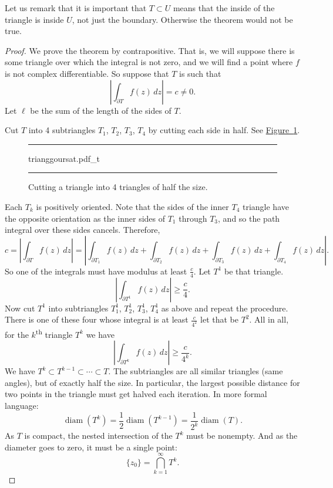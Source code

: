 \documentclass[12pt,openany]{book}
\newcommand{\abs}[1]{\left\lvert {#1} \right\rvert}
\theoremstyle{plain}
\theoremstyle{remark}
\theoremstyle{definition}
\newenvironment{myfig}{%
\begin{figure}[h!t]
\noindent\rule{\textwidth}{0.4pt}\vspace{12pt}\par\centering}%
{\par\noindent\rule{\textwidth}{0.4pt}
\end{figure}}
\theoremstyle{exercise}
\theoremstyle{example}
\newcommand{\figureref}[1]{\hyperref[#1]{Figure~\ref*{#1}}}
\begin{document}
Let us remark that it is important that $T \subset U$ means that the inside
of the triangle is inside $U$, not just the boundary.  Otherwise the theorem
would not be true.

\begin{proof}
We prove the theorem by contrapositive.  That is, we will suppose there is
some triangle over which the integral is not zero, and we will find a point
where $f$ is not complex differentiable.  So suppose that $T$ is such
that
\begin{equation*}
\abs{\int_{\partial T} f(z) \, dz} = c \not= 0 .
\end{equation*}
Let $\ell$ be the sum of the length of the sides of $T$.

Cut $T$ into 4 subtriangles
$T_1$, $T_2$, $T_3$, $T_4$ by cutting each side in half.  See
\figureref{fig:trianggoursat}.
\begin{myfig}
{trianggoursat.pdf_t}
\caption{Cutting a triangle into 4 triangles of half the size.%
\label{fig:trianggoursat}}
\end{myfig}

Each $T_k$ is positively oriented.
Note that the sides of the inner $T_4$ triangle have the opposite
orientation as the inner sides of $T_1$ through $T_3$, and
so the path integral over these sides cancels.  Therefore,
\begin{equation*}
c = 
\abs{\int_{\partial T} f(z) \, dz }
=
\abs{\int_{\partial T_1} f(z) \, dz 
+
\int_{\partial T_2} f(z) \, dz 
+
\int_{\partial T_3} f(z) \, dz 
+
\int_{\partial T_4} f(z) \, dz } .
\end{equation*}
So one of the integrals must have modulus at least $\frac{c}{4}$.  Let $T^1$
be that triangle.
\begin{equation*}
\abs{\int_{\partial T^1} f(z) \, dz } \geq \frac{c}{4} .
\end{equation*}
Now cut $T^1$ into subtriangles
$T_1^1$, $T_2^1$, $T_3^1$, $T_4^1$ as above and repeat the procedure.  There
is one of these four whose integral is at least $\frac{c}{4^2}$ let that be
$T^2$.  All in all, for the $k$\textsuperscript{th} triangle $T^k$ we have
\begin{equation*}
\abs{\int_{\partial T^k} f(z) \, dz } \geq \frac{c}{4^k} .
\end{equation*}
We have $T^k \subset T^{k-1} \subset \cdots \subset T$.
The subtriangles are all similar triangles (same angles),
but of exactly half the size.
In particular,
the largest possible distance for two points in the triangle must
get halved each iteration.
In more formal language:
\begin{equation*}
\operatorname{diam}(T^k) =
\frac{1}{2} \operatorname{diam}(T^{k-1})
=
\frac{1}{2^k} \operatorname{diam}(T) .
\end{equation*}
As $T$ is compact, the nested intersection of the $T^k$ must be nonempty.
And as the diameter goes to zero, it must be a single point:
\begin{equation*}
\{ z_0 \} = \bigcap_{k=1}^\infty T^k .
\end{equation*}


\end{proof}
\end{document}
